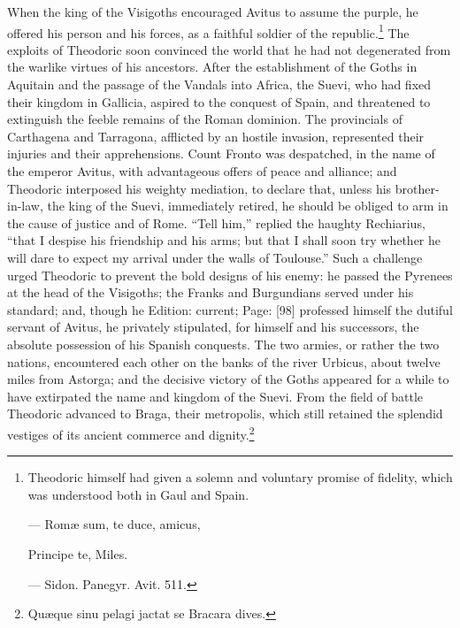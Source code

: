 {}When the king of the Visigoths encouraged Avitus to assume the purple, he offered his person and his forces, as a faithful soldier of the republic.\footnote{Theodoric himself had given a solemn and voluntary promise of fidelity, which was understood both in Gaul and Spain.

\texthebrew{—} Romæ sum, te duce, amicus,

Principe te, Miles.

\texthebrew{—} Sidon. Panegyr. Avit. 511.} The exploits of Theodoric soon convinced the world that he had not degenerated from the warlike virtues of his ancestors. After the establishment of the Goths in Aquitain and the passage of the Vandals into Africa, the Suevi, who had fixed their kingdom in Gallicia, aspired to the conquest of Spain, and threatened to extinguish the feeble remains of the Roman dominion. The provincials of Carthagena and Tarragona, afflicted by an hostile invasion, represented their injuries and their apprehensions. Count Fronto was despatched, in the name of the emperor Avitus, with advantageous offers of peace and alliance; and Theodoric interposed his weighty mediation, to declare that, unless his brother-in-law, the king of the Suevi, immediately retired, he should be obliged to arm in the cause of justice and of Rome. \texthebrew{“}Tell him,\texthebrew{}” replied the haughty Rechiarius, \texthebrew{“}that I despise his friendship and his arms; but that I shall soon try whether he will dare to expect my arrival under the walls of Toulouse.\texthebrew{}” Such a challenge urged Theodoric to prevent the bold designs of his enemy: he passed the Pyrenees at the head of the Visigoths; the Franks and Burgundians served under his standard; and, though he Edition: current; Page: [98] professed himself the dutiful servant of Avitus, he privately stipulated, for himself and his successors, the absolute possession of his Spanish conquests. The two armies, or rather the two nations, encountered each other on the banks of the river Urbicus, about twelve miles from Astorga; and the decisive victory of the Goths appeared for a while to have extirpated the name and kingdom of the Suevi. From the field of battle Theodoric advanced to Braga, their metropolis, which still retained the splendid vestiges of its ancient commerce and dignity.\footnote{Quæque sinu pelagi jactat se Bracara dives.

}
